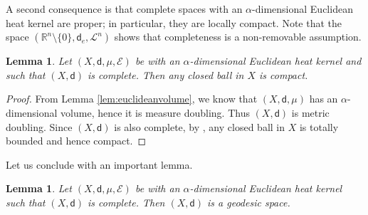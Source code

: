 \documentclass[JEP,XML,SOM,Unicode,published]{cedram}
\let\backslash\setminus
\theoremstyle{plain}
\newtheorem{lemma}[theorem]{Lemma}
\theoremstyle{definition}
\newcommand{\setR}{\mathbb{R}}
\newcommand{\cE}{\mathcal{E}}
\newcommand{\leb}{\mathscr{L}}
\newcommand{\dist}{\mathsf{d}}
\begin{document}
A second consequence is that complete spaces with an $\alpha$-dimensional Euclidean heat kernel are proper; in particular, they are locally compact. Note that the space $(\setR^n \backslash \{0\}, \dist_e,\leb^n)$ shows that completeness is a non-removable assumption.

\begin{lemma}
Let $(X,\dist,\mu,\cE)$ be with an $\alpha$-dimensional Euclidean heat kernel and such that $(X,\dist)$ is complete. Then any closed ball in $X$ is compact.
\end{lemma}

\begin{proof}
From Lemma \ref{lem:euclideanvolume}, we know that $(X,\dist,\mu)$ has an $\alpha$-dimensional volume, hence it is measure doubling. Thus $(X,\dist)$ is metric doubling. Since $(X,\dist)$ is also complete, by \cite[Exer.\,10.17]{Heinonen}, any closed ball in $X$ is totally bounded and hence compact.
\end{proof}

Let us conclude with an important lemma.

\begin{lemma}
Let $(X,\dist,\mu,\cE)$ be with an $\alpha$-dimensional Euclidean heat kernel such that $(X,\dist)$ is complete. Then $(X,\dist)$ is a geodesic space.
\end{lemma}
\end{document}
